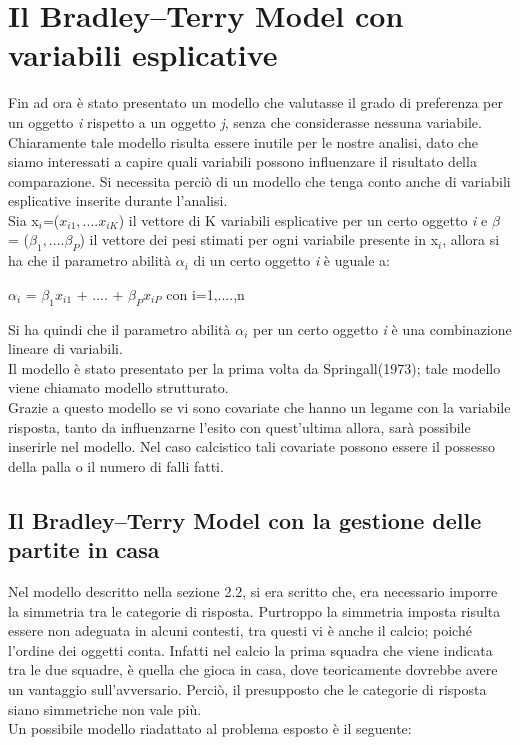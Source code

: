 \section{Il Bradley–Terry Model con variabili esplicative}
Fin ad ora è stato presentato un modello che valutasse il grado di preferenza per un oggetto \textit{i} rispetto a un oggetto \textit{j}, senza che considerasse nessuna variabile. Chiaramente tale modello risulta essere inutile per le nostre analisi, dato che siamo interessati a capire quali variabili possono influenzare il risultato della comparazione. Si necessita perciò di un modello che tenga conto anche di variabili esplicative inserite durante l'analisi. \\
Sia x$_{i}$=($x_{i1},....x_{iK}$) il vettore di K variabili esplicative per un certo oggetto \textit{i} e $\beta$ = ($\beta_{1},....\beta_{P}$) il vettore dei pesi stimati per ogni variabile presente in x$_{i}$, allora si ha che il parametro abilità $\alpha_{i}$ di un certo oggetto \textit{i} è uguale a:

\begin{center}
	\begin{large}
	 $\alpha_{i}$ = $\beta_{1}x_{i1}$ + .... + $\beta_{P}x_{iP}$      con i=1,....,n
	\end{large}

\end{center}

Si ha quindi che il parametro abilità $\alpha_{i}$ per un certo oggetto \textit{i} è una combinazione lineare di variabili.\\
Il modello è stato presentato per la prima volta da Springall(1973); tale modello viene chiamato modello strutturato.\\
 
Grazie a questo modello se vi sono covariate che hanno un legame con la variabile risposta, tanto da influenzarne l'esito con quest'ultima allora, sarà possibile inserirle nel modello. Nel caso calcistico tali covariate possono essere il possesso della palla o il numero di falli fatti.


\subsection{Il Bradley–Terry Model con la gestione delle partite in casa}
Nel modello descritto nella sezione 2.2, si era scritto che, era necessario imporre la simmetria tra le categorie di risposta. Purtroppo la simmetria imposta risulta essere non adeguata in alcuni contesti, tra questi vi è anche il calcio; poiché l'ordine dei oggetti conta. Infatti nel calcio la prima squadra che viene indicata tra le due squadre, è quella che gioca in casa, dove teoricamente dovrebbe avere un vantaggio sull'avversario. Perciò, il presupposto che le categorie di risposta siano simmetriche non vale più. \\
Un possibile modello riadattato al problema esposto è il seguente:

